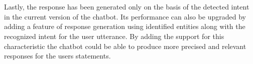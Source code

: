 \\~\\
Lastly, the response has been generated only on the basis of the detected intent in the current version of the chatbot. Its performance can also be upgraded by adding a feature of response generation using identified entities along with the recognized intent for the user utterance. By adding the support for this characteristic the chatbot could be able to produce more precised and relevant responses for the users statements.